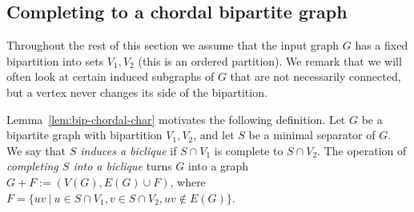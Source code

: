 \documentclass[11pt,a4paper]{article}
\theoremstyle{definition}
\begin{document}
\subsection{Completing to a chordal bipartite graph}\label{ss:bip-complete}

Throughout the rest of this section we assume that the input graph $G$ has a fixed bipartition into sets $V_1,V_2$ (this is an ordered partition).
We remark that we will often look at certain induced subgraphs of $G$ that are not necessarily connected,
but a vertex never changes its side of the bipartition.

Lemma~\ref{lem:bip-chordal-char} motivates the following definition.
Let $G$ be a bipartite graph with bipartition $V_1,V_2$, and let $S$ be a minimal separator of $G$.
We say that \emph{$S$ induces a biclique} if $S \cap V_1$ is complete to $S \cap V_2$.
The operation of \emph{completing $S$ into a biclique} turns $G$ into a graph $G+F := (V(G), E(G) \cup F)$,
where $F = \{uv~|~u \in S \cap V_1, v \in S \cap V_2, uv \notin E(G)\}$.
\end{document}
